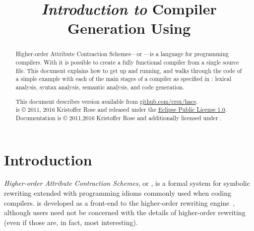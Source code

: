 \documentclass[11pt]{article} %
\title{
  \emph{Introduction to} Compiler Generation Using \HAX
}
\author{
  \authorname1{Kristoffer H. Rose}
  \authorinstitution1{Two Sigma Investments}
}
\newcommand{\basecopyright}{\noindent
  \HAX is © 2011, 2016 Kristoffer Rose and released under the
  \href{https://www.eclipse.org/legal/epl-v10.html}{Eclipse Public License 1.0}.\\
  \noindent\doclicenseImage[imagewidth=3em] Documentation is © 2011,2016 Kristoffer Rose and additionally licensed under \doclicenseNameRef.}
\newcommand{\documentcopyright}{\basecopyright}
\begin{document}
\maketitle

\begin{abstract}\noindent
  Higher-order Attribute Contraction Schemes---or \HAX---is a language for programming compilers.
  With \HAX it is possible to create a fully functional compiler from a single source file.  This
  document explains how to get \HAX up and running, and walks through the code of a simple example
  with each of the main stages of a compiler as specified in \HAX: lexical analysis, syntax
  analysis, semantic analysis, and code generation.

  \compacttableofcontents

  \vspace*{2em}\small\color{gray}\noindent%
  This document describes \HAX version \version available from
  \href{http://github.com/crsx/hacs}{github.com/crsx/hacs}.\\
  \documentcopyright
\end{abstract}


\section{Introduction}\label{sec:intro}

\emph{Higher-order Attribute Contraction Schemes}, or \HAX, is a formal system for symbolic
rewriting extended with programming idioms commonly used when coding compilers. \HAX is developed as
a front-end to the \CRSX higher-order rewriting engine~\cite{crsx}, although \HAX users need not be
concerned with the details of higher-order rewriting (even if those are, in fact, most interesting).
\end{document}
